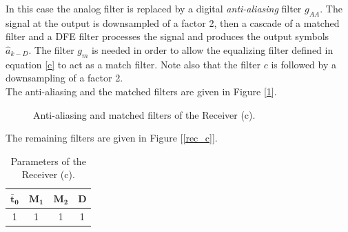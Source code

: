 \documentclass[a4paper, 12pt]{report}
\begin{document}
In this case the analog filter is replaced by a digital \textit{anti-aliasing} filter $g_{AA}$. The signal at the output is downsampled of a factor 2, then a cascade of a matched filter and a DFE  filter processes the signal and produces the output symbols $\hat{a}_{k-D}$. The filter $g_m$ is needed in order to allow the equalizing filter defined in equation \ref{c} to act as a match filter. Note also that the filter $c$ is followed by a downsampling of a factor 2. \\
The anti-aliasing and the matched filters are given in Figure [\ref{filters_c}].

\begin{figure}[H]
	\centering
	\caption{Anti-aliasing and matched filters of the Receiver (c).}\label{filters_c}
\end{figure}

The remaining filters are given in Figure [\ref{rec_c}].
\begin{table}[H]
	\centering
	\begin{tabular}{c c c c}
		\toprule
		$\mathbf{\bar{t}_0}$ & $\mathbf{M_1}$ & $\mathbf{M_2}$ & \textbf{D}     \\
		\midrule
		1 & 1 & 1 & 1 \\
		\bottomrule			
	\end{tabular}
	\caption{Parameters of the Receiver (c).}
	\label{Tab_a}
\end{table}
\end{document}
